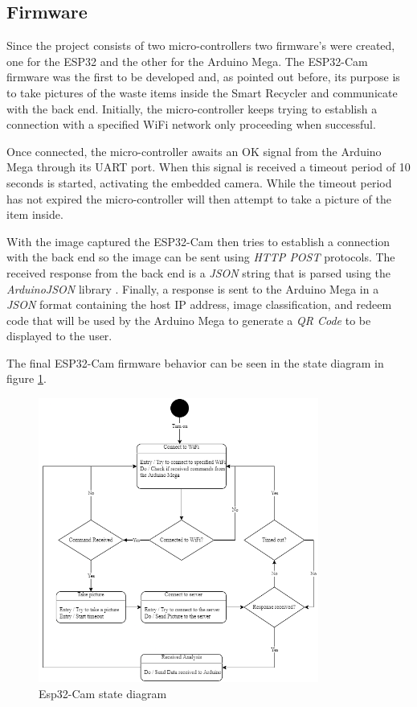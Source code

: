 \documentclass[a4paper,11pt]{article}
\begin{document}
\newpage

\subsection{Firmware}
Since the project consists of two micro-controllers two firmware's were created, one for the ESP32 and the other for the Arduino Mega. The ESP32-Cam firmware was the first to be developed and, as pointed out before, its purpose is to take pictures of the waste items inside the Smart Recycler and communicate with the back end. Initially, the micro-controller keeps trying to establish a connection with a specified WiFi network only proceeding when successful.

Once connected, the micro-controller awaits an OK signal from the Arduino Mega through its UART port. When this signal is received a timeout period of 10 seconds is started, activating the embedded camera. While the timeout period has not expired the micro-controller will then attempt to take a picture of the item inside.

With the image captured the ESP32-Cam then tries to establish a connection with the back end so the image can be sent using \textit{HTTP POST} protocols. The received response from the back end is a \textit{JSON} string that is parsed using the \textit{ArduinoJSON} library \cite{ArduinoJson}. Finally, a response is sent to the Arduino Mega in a \textit{JSON} format containing the host IP address, image classification, and redeem code that will be used by the Arduino Mega to generate a \textit{QR Code} to be displayed to the user.

The final ESP32-Cam firmware behavior can be seen in the state diagram in figure \ref{fig:espState}.

\begin{figure}[H]
  \centering
  \includegraphics[width=9.2cm]{Figures/State Chart Esp32.png}
  \caption{\small{Esp32-Cam state diagram}}
  \label{fig:espState}
\end{figure}
\end{document}
